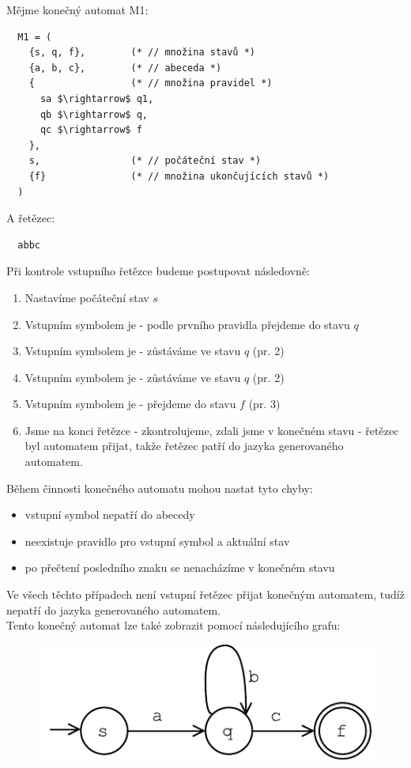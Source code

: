 \begin{exmp}
  Mějme konečný automat M1:
  \begin{lstlisting}
  M1 = (
    {s, q, f},        (* // množina stavů *)
    {a, b, c},        (* // abeceda *)
    {                 (* // množina pravidel *)
      sa $\rightarrow$ q1,
      qb $\rightarrow$ q,
      qc $\rightarrow$ f
    },
    s,                (* // počáteční stav *)
    {f}               (* // množina ukončujících stavů *)
  )
  \end{lstlisting}
  A řetězec:
\begin{lstlisting}
  abbc
\end{lstlisting}

\noindent
Při kontrole vstupního řetězce budeme postupovat následovně:

\begin{enumerate}
  \item Nastavíme počáteční stav $s$
  \item Vstupním symbolem je  - podle prvního pravidla přejdeme do stavu $q$
  \item Vstupním symbolem je  - zůstáváme ve stavu $q$ (pr. 2)
  \item Vstupním symbolem je  - zůstáváme ve stavu $q$ (pr. 2)
  \item Vstupním symbolem je  - přejdeme do stavu $f$ (pr. 3)
  \item Jsme na konci řetězce - zkontrolujeme, zdali jsme v konečném stavu - řetězec byl automatem přijat,
  takže řetězec patří do jazyka generovaného automatem.
\end{enumerate}

\noindent
Během činnosti konečného automatu mohou nastat tyto chyby:

\begin{itemize}
  \item vstupní symbol nepatří do abecedy
  \item neexistuje pravidlo pro vstupní symbol a aktuální stav
  \item po přečtení posledního znaku se nenacházíme v konečném stavu
\end{itemize}
Ve všech těchto případech není vstupní řetězec přijat konečným automatem, tudíž nepatří
do jazyka generovaného automatem.\\

\noindent
Tento konečný automat lze také zobrazit pomocí následujícího grafu:

\begin{figure}[H]
  \centering
  \includegraphics{fig/finiteAutomat.pdf}
\end{figure}

\end{exmp}

